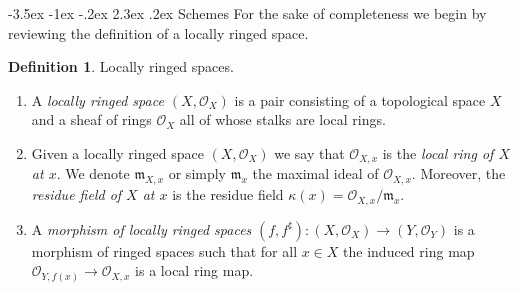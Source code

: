 \documentclass[11pt]{amsart}
\makeatletter
\renewcommand\section{\@startsection {section}{1}{\z@}%
	{-3.5ex \@plus -1ex \@minus -.2ex}%
	{2.3ex \@plus.2ex}%
	{\normalfont\scshape\center}}
\newcommand{\Spec}{{\rm Spec \,}}
\newcommand{\A}{{\mathbb A}}
\newcommand{\C}{{\mathbb C}}
\renewcommand{\P}{{\mathbb P}}
\newcommand{\R}{{\mathbb R}}
\theoremstyle{definition}
\newtheorem{definition}[theorem]{Definition}
\makeatother
\begin{document}
\begin{comment}
Things to say: finite-generation, valuative criteria for $\P^1$ (using DVR's - how giving a point and its specialisation is the same as giving a map $\Spec R\rightarrow \P^1$).\\
List of examples:
\begin{enumerate}
	\item $\A^1$ with a double point (what are quasi-coherent sheaves on this?)
	\item $\A^2\setminus \lbrace 0,0\rbrace$ (what is the structure sheaf?).
	\item $\P^1$ (its structure sheaf!).
	\item $V_{+}(x^2+y^2+z^2)$ over $\R$ and $\C$. The point is that there is a change of coordintes which 
	\item Blow-up of $\A^2$ at a point. (because everyone should know about blow-ups!)
	\item $\Spec R[x_1,x_2,\ldots]$ as an example of something non-noetherian.
	\item An example of a scheme without a closed point.
\end{enumerate}

List of morphisms:
\begin{enumerate}
	\item $x\mapsto x^2$ (more, generally $x^n$). This covers ramified, finitely presented, flat.
	\item a non-quasi-compact open-immersion. Polynomial ring in infinitely many variables and knock off the origin. Also, the origin of is an example of something 
\end{enumerate}
\end{comment}

\section{Schemes}
For the sake of completeness we begin by reviewing the definition of a locally ringed space.

\begin{definition}
	\label{definition-locally-ringed-space}
	Locally ringed spaces.
	\begin{enumerate}
		\item A {\it locally ringed space $(X, \mathcal{O}_X)$}
		is a pair consisting of a
		topological space $X$ and a sheaf of rings $\mathcal{O}_X$ all of whose stalks
		are local rings.
		\item Given a locally ringed space $(X, \mathcal{O}_X)$ we say that
		$\mathcal{O}_{X, x}$ is the {\it local ring of $X$ at $x$}.
		We denote $\mathfrak{m}_{X, x}$ or simply $\mathfrak{m}_x$
		the maximal ideal of $\mathcal{O}_{X, x}$. Moreover, the
		{\it residue field of $X$ at $x$} is the residue field
		$\kappa(x) = \mathcal{O}_{X, x}/\mathfrak{m}_x$.
		\item A {\it morphism of locally ringed spaces}
		$(f, f^\sharp) : (X, \mathcal{O}_X) \to (Y, \mathcal{O}_Y)$
		is a morphism of ringed spaces such that for all $x \in X$
		the induced ring map $\mathcal{O}_{Y, f(x)} \to \mathcal{O}_{X, x}$ is a
		local ring map.
	\end{enumerate}
\end{definition}
\end{document}
